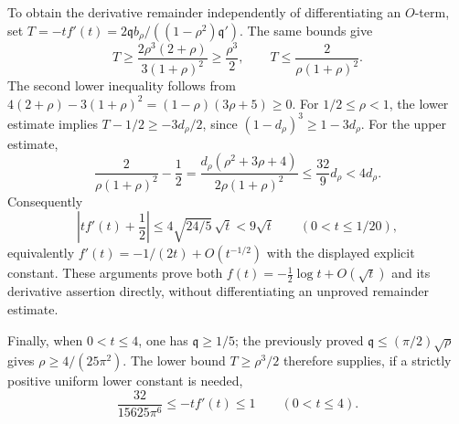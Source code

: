 To obtain the derivative remainder independently of differentiating
an $O$-term, set $T=-tf'(t)=2\mathfrak q b_\rho/((1-\rho^2)\mathfrak q')$.
The same bounds give
\[
 T\ge\frac{2\rho^3(2+\rho)}{3(1+\rho)^2}
 \ge\frac{\rho^3}{2},
 \qquad T\le\frac{2}{\rho(1+\rho)^2}.
\]
The second lower inequality follows from
$4(2+\rho)-3(1+\rho)^2=(1-\rho)(3\rho+5)\ge0$.
For $1/2\le\rho<1$, the lower estimate implies
$T-1/2\ge-3d_\rho/2$, since $(1-d_\rho)^3\ge1-3d_\rho$.
For the upper estimate,
\[
 \frac{2}{\rho(1+\rho)^2}-\frac12
 =\frac{d_\rho(\rho^2+3\rho+4)}{2\rho(1+\rho)^2}
 \le\frac{32}{9}d_\rho<4d_\rho.
\]
Consequently
\[
 \boxed{
 \left|t f'(t)+\frac12\right|
 \le4\sqrt{24/5}\,\sqrt t<9\sqrt t
 \qquad(0<t\le1/20),}
\]
equivalently $f'(t)=-1/(2t)+O(t^{-1/2})$ with the displayed
explicit constant. These arguments prove both
$f(t)=-\tfrac12\log t+O(\sqrt t)$ and its derivative assertion
directly, without differentiating an unproved remainder estimate.

Finally, when $0<t\le4$, one has $\mathfrak q\ge1/5$; the previously proved
$\mathfrak q\le(\pi/2)\sqrt\rho$ gives
$\rho\ge4/(25\pi^2)$. The lower bound $T\ge\rho^3/2$
therefore supplies, if a strictly positive uniform lower constant is needed,
\[
 \boxed{\frac{32}{15625\pi^6}\le -t f'(t)\le1
 \qquad(0<t\le4).}
\]




